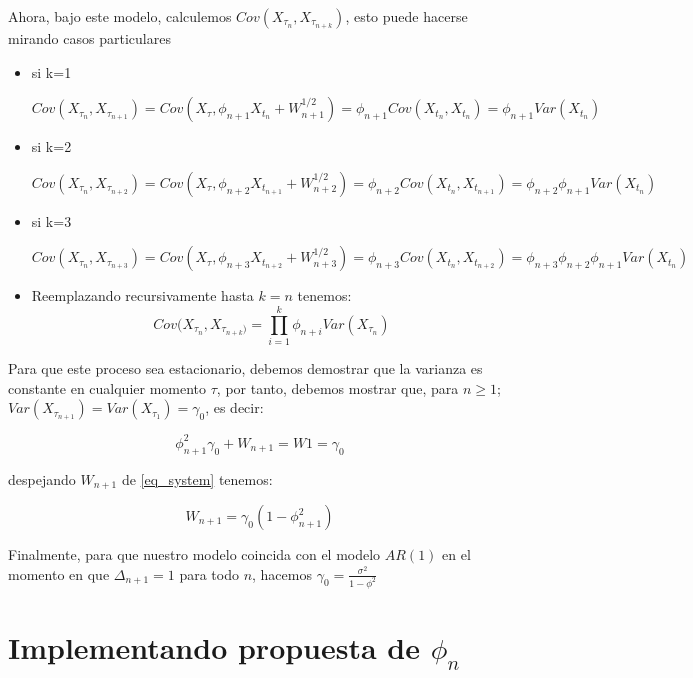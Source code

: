 Ahora, bajo este modelo, calculemos $Cov(X_{\tau_{n}}, X_{\tau_{n+k}})$, esto puede hacerse mirando casos particulares

\begin{itemize}
\item si k=1

$Cov(X_{\tau_n}, X_{\tau_{n+1}}) = Cov(X_{\tau}, \phi_{n+1} X_{t_n} +W_{n+1}^{1/2}) = \phi_{n+1} Cov(X_{t_n}, X_{t_n}) = \phi_{n+1} Var(X_{t_n}) $

\item si k=2

$Cov(X_{\tau_n}, X_{\tau_{n+2}}) = Cov(X_{\tau}, \phi_{n+2} X_{t_{n+1}} +W_{n+2}^{1/2}) = \phi_{n+2} Cov(X_{t_n}, X_{t_{n+1}}) = \phi_{n+2} \phi_{n+1} Var(X_{t_n})$

\item si k=3

$Cov(X_{\tau_n}, X_{\tau_{n+3}}) = Cov(X_{\tau}, \phi_{n+3} X_{t_{n+2}} +W_{n+3}^{1/2}) = \phi_{n+3} Cov(X_{t_n}, X_{t_{n+2}}) = \phi_{n+3}\phi_{n+2} \phi_{n+1} Var(X_{t_n})$

\item Reemplazando recursivamente hasta $k=n$ tenemos:
\begin{equation}
Cov(X_{\tau_n}, X_{\tau_{n+k})} = \displaystyle\prod_{i=1}^{k} \phi_{n+i}Var(X_{\tau_n})
\label{cov_propuesta}
\end{equation}

\end{itemize}

Para que este proceso sea estacionario, debemos demostrar que la varianza es constante en cualquier momento $\tau$, por tanto, debemos mostrar que, para $n \geq 1$; $Var(X_{\tau_{n+1}}) = Var(X_{\tau_1}) = \gamma_0$, es decir:

\begin{equation}
\phi_{n+1}^{2}\gamma_0 + W_{n+1} = W1 = \gamma_0
\label{eq_system}
\end{equation}

despejando $W_{n+1}$ de \ref{eq_system} tenemos:

\begin{equation}
W_{n+1} = \gamma_0 (1-\phi_{n+1}^2)
\label{eq:w}
\end{equation}

Finalmente, para que nuestro modelo coincida con el modelo $AR(1)$ en el momento en que $\Delta_{n+1}=1$ para todo $n$, hacemos $\gamma_0 = \frac{\sigma^2}{1-\phi^2}$

\section{Implementando propuesta de $\phi_n$}

